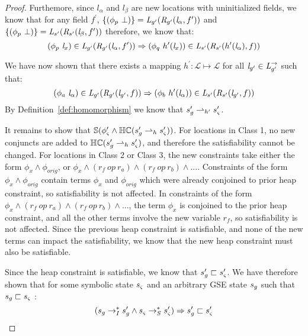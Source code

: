 \begin{proof}
Furthemore, since $l_\alpha$ and $l_\beta$ are new locations with uninitialized fields, we know that for any field $f^\prime$, $\{(\phi_p\ \bot)\} = \emph{L}_{g^\prime}(\emph{R}_{g^\prime} (\emph{l}_\alpha,f^\prime ))$ and $ \{(\phi_p\ \bot)\} = \emph{L}_{s^\prime}(\emph{R}_{s^\prime} (\emph{l}_\beta,f^\prime ))$ therefore, we know that:
$$(\phi_p\ \emph{l}_x) \in \emph{L}_{g^\prime}(\emph{R}_{g^\prime} (\emph{l}_\alpha,f^\prime )) \Rightarrow (\phi_q\ h^\prime (\emph{l}_x))\in \emph{L}_{s^\prime}(\emph{R}_{s^\prime} ( h^\prime(\emph{l}_\alpha),f ))$$

We have now shown that there exists a mapping $h^\prime: \mathcal{L} \mapsto \mathcal{L}$ for all $\emph{l}_{g^\prime} \in \emph{L}_{g^\prime}^\rightarrow$ such that:
$$ (\phi_a\ \emph{l}_\alpha) \in \emph{L}_{g^\prime}(\emph{R}_{g^\prime} (\emph{l}_{g^\prime},f )) \Rightarrow (\phi_b\ h^\prime (\emph{l}_\alpha))\in \emph{L}_{s^\prime}(\emph{R}_{s^\prime} (\emph{l}_{g^\prime},f )) $$
By Definition~\ref{def:homomorphism} we know that $s_{g}^\prime \rightharpoonup_{h^\prime} s_{\varsigma}^\prime$. 

It remains to show that $\mathbb{S}( \phi_{\varsigma}^\prime \wedge \mathbb{HC}(s_{g}^\prime \rightharpoonup_{h} s_{\varsigma}^\prime) )$. For locations in Class 1, no new conjuncts are added to $\mathbb{HC}(s_{g}^\prime \rightharpoonup_{h} s_{\varsigma}^\prime)$, and therefore the satisfiability cannot be changed. For locations in Class 2 or Class 3, the new constraints take either the form $\phi_x \wedge \phi_{orig}$, or $\phi_x \wedge (r_f\ op\ r_{a}) \wedge (r_f\ op\ r_{b}) \wedge ...$. Constraints of the form  $\phi_x \wedge \phi_{orig}$ contain terms $\phi_x$ and $\phi_{orig}$ which were already conjoined to prior heap constraint, so satisfiability is not affected. In constraints of the form $\phi_x \wedge (r_f\ op\ r_{a}) \wedge (r_f\ op\ r_{b}) \wedge ...$, the term $\phi_x$ is conjoined to the prior heap constraint, and all the other terms involve the new variable $r_f$, so satisfiability is not affected. Since the previous heap constraint is satisfiable, and none of the new terms can impact the satisfiability, we know that the new heap constraint must also be satisfiable.

Since the heap constraint is satisfiable, we know that $s_{g}^\prime \sqsubset s_{\varsigma}^\prime $. We have therefore shown that for some symbolic state $s_{\varsigma}$ and an arbitrary GSE state $s_{g}$ such that $s_{g} \sqsubset s_{\varsigma}$ :
\begin{equation} 
(s_{g} \rightarrow_I^* s_{g}^\prime \wedge s_{\varsigma} \rightarrow_S^* s_{\varsigma}^\prime) \Rightarrow s_{g}^\prime \sqsubset s_{\varsigma}^\prime 
\end{equation}



\end{proof}
